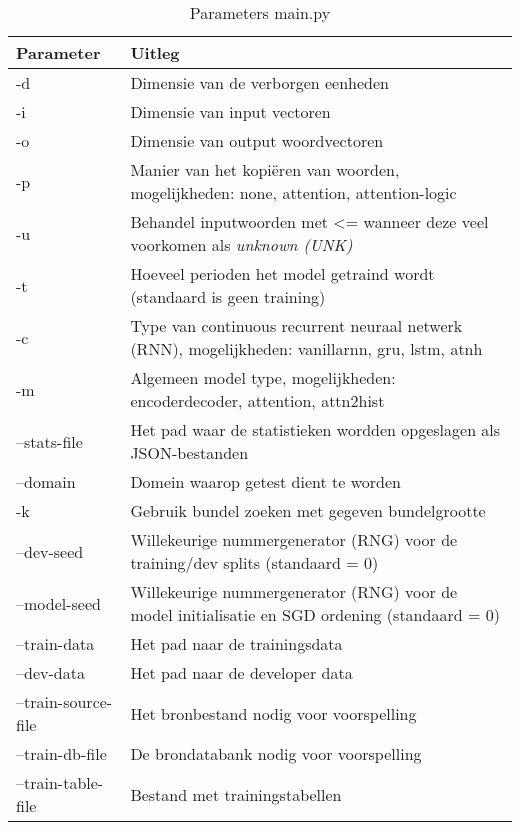 \begin{table}[]
	\centering
	\begin{tabular}{ | l | p{10cm} |}
		\hline
		Parameter 			& Uitleg \\ \hline
		-d 					& Dimensie van de verborgen eenheden \\ \hline
		-i 					& Dimensie van input vectoren \\ \hline
		-o					& Dimensie van output woordvectoren \\ \hline
		-p					& Manier van het kopiëren van woorden, mogelijkheden: none, attention, attention-logic \\ \hline
		-u 					& Behandel inputwoorden met <= wanneer deze veel voorkomen als \textit{unknown (UNK)} \\ \hline
		-t					& Hoeveel perioden het model getraind wordt (standaard is geen training) \\ \hline
		-c					& Type van continuous recurrent neuraal netwerk (RNN), mogelijkheden: vanillarnn, gru, lstm, atnh \\ \hline
		-m					& Algemeen model type, mogelijkheden: encoderdecoder, attention, attn2hist \\ \hline	 
		--stats-file		& Het pad waar de statistieken wordden opgeslagen als JSON-bestanden \\ \hline	 
		--domain			& Domein waarop getest dient te worden \\ \hline	 
		-k					& Gebruik bundel zoeken met gegeven bundelgrootte \\ \hline	 
		--dev-seed			& Willekeurige nummergenerator (RNG) voor de training/dev splits (standaard = 0) \\ \hline	 
		--model-seed		& Willekeurige nummergenerator (RNG) voor de model initialisatie en SGD ordening (standaard = 0) \\ \hline	 
		--train-data		& Het pad naar de trainingsdata \\ \hline	 
		--dev-data			& Het pad naar de developer data \\ \hline	 
		--train-source-file	& Het bronbestand nodig voor voorspelling \\ \hline	 
		--train-db-file		& De brondatabank nodig voor voorspelling \\ \hline	 
		--train-table-file	& Bestand met trainingstabellen \\ \hline	 
	\end{tabular}
	\caption{Parameters main.py}
	\label{table:parammain}
\end{table}

